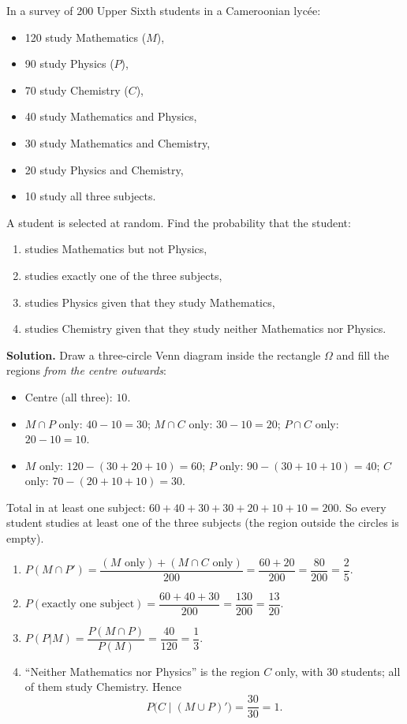 \documentclass[11pt]{article}
\begin{document}
\begin{exoresolu}
In a survey of 200 Upper Sixth students in a Cameroonian lyc\'ee:
\begin{itemize}
    \item 120 study Mathematics ($M$),
    \item 90 study Physics ($P$),
    \item 70 study Chemistry ($C$),
    \item 40 study Mathematics and Physics,
    \item 30 study Mathematics and Chemistry,
    \item 20 study Physics and Chemistry,
    \item 10 study all three subjects.
\end{itemize}
A student is selected at random. Find the probability that the student:
\begin{enumerate}
    \item studies Mathematics but not Physics,
    \item studies exactly one of the three subjects,
    \item studies Physics given that they study Mathematics,
    \item studies Chemistry given that they study neither Mathematics nor Physics.
\end{enumerate}
\tcblower
\textbf{Solution.}
Draw a three-circle Venn diagram inside the rectangle $\Omega$ and fill the regions \emph{from the centre outwards}:
\begin{itemize}
    \item Centre (all three): $10$.
    \item $M \cap P$ only: $40 - 10 = 30$; \quad $M \cap C$ only: $30 - 10 = 20$; \quad $P \cap C$ only: $20 - 10 = 10$.
    \item $M$ only: $120 - (30+20+10) = 60$; \quad $P$ only: $90 - (30+10+10) = 40$; \quad $C$ only: $70 - (20+10+10) = 30$.
\end{itemize}
Total in at least one subject: $60+40+30+30+20+10+10 = 200$. So every student studies at least one of the three subjects (the region outside the circles is empty).
\begin{enumerate}
    \item $P(M \cap P') = \dfrac{(M \text{ only}) + (M \cap C \text{ only})}{200} = \dfrac{60+20}{200} = \dfrac{80}{200} = \dfrac{2}{5}$.
    \item $P(\text{exactly one subject}) = \dfrac{60+40+30}{200} = \dfrac{130}{200} = \dfrac{13}{20}$.
    \item $P(P|M) = \dfrac{P(M \cap P)}{P(M)} = \dfrac{40}{120} = \dfrac{1}{3}$.
    \item ``Neither Mathematics nor Physics'' is the region $C$ only, with 30 students; all of them study Chemistry. Hence
    \[
    P\bigl(C \mid (M \cup P)'\bigr) = \frac{30}{30} = 1.
    \]
\end{enumerate}
\end{exoresolu}
\end{document}

